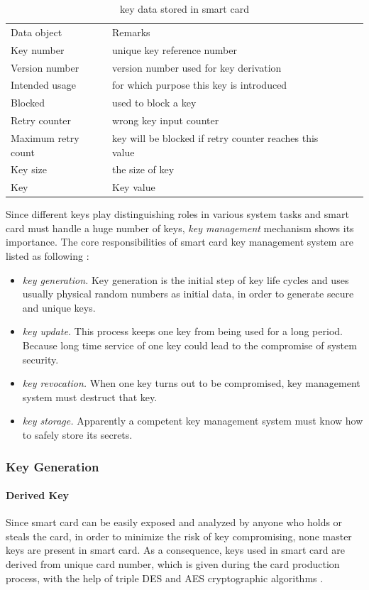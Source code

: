 \begin{table}[!htb]
\caption{key data stored in smart card\cite{handbook}}
\begin{tabular}{lllll}
\hline\hline
Data object & Remarks\\[0.5ex]
Key number & unique key reference number\\
Version number & version number used for key derivation\\
Intended usage & for which purpose this key is introduced\\
Blocked & used to block a key\\
Retry counter & wrong key input counter\\
Maximum retry count & key will be blocked if retry counter reaches this value\\
Key size & the size of key\\
Key & Key value\\
\hline
\end{tabular}
\label{table:smart-card-key}
\end{table}

Since different keys play distinguishing roles in various system tasks and smart card must handle a huge number of keys, \emph{key management} mechanism shows its importance. The core responsibilities of smart card key management system are listed as following \cite{handbook}:
\begin{itemize}
\item \emph{key generation.} Key generation is the initial step of key life cycles and uses usually physical random numbers as initial data, in order to generate secure and unique keys. 
\item \emph{key update.} This process keeps one key from being used for a long period. Because long time service of one key could lead to the compromise of system security.
\item \emph{key revocation.} When one key turns out to be compromised, key management system must destruct that key.
\item \emph{key storage.} Apparently a competent key management system must know how to safely store its secrets.
\end{itemize}
\subsubsection{Key Generation}
\paragraph{Derived Key}
Since smart card can be easily exposed and analyzed by anyone who holds or steals the card, in order to minimize the risk of key compromising, none master keys are present in smart card. As a consequence, keys used in smart card are derived from unique card number, which is given during the card production process, with the help of triple DES and AES cryptographic algorithms \cite{handbook}.
